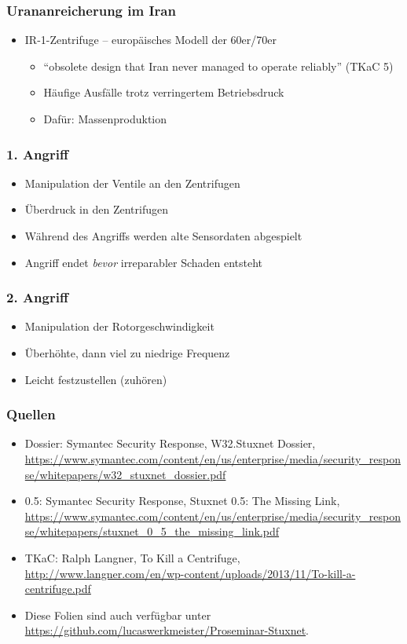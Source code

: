 \documentclass{beamer}
\begin{document}
\begin{frame}
  \frametitle{Urananreicherung im Iran}
  \begin{itemize}
    \item IR-1-Zentrifuge – europäisches Modell der 60er/70er
      \begin{itemize}
        \item ``obsolete design that Iran never managed to operate reliably'' (TKaC 5)
        \item Häufige Ausfälle trotz verringertem Betriebsdruck
        \item Dafür: Massenproduktion
      \end{itemize}
  \end{itemize}
\end{frame}

\begin{frame}
  \frametitle{1. Angriff}
  \begin{itemize}
    \item Manipulation der Ventile an den Zentrifugen
    \item Überdruck in den Zentrifugen
    \item Während des Angriffs werden alte Sensordaten abgespielt
    \item Angriff endet \emph{bevor} irreparabler Schaden entsteht
  \end{itemize}
\end{frame}

\begin{frame}
  \frametitle{2. Angriff}
  \begin{itemize}
    \item Manipulation der Rotorgeschwindigkeit
    \item Überhöhte, dann viel zu niedrige Frequenz
    \item Leicht festzustellen (zuhören)
  \end{itemize}
\end{frame}



\begin{frame}
  \frametitle{Quellen}
  \fontsize{6pt}{7.2}\selectfont
  \begin{itemize}
    \item Dossier: Symantec Security Response, W32.Stuxnet Dossier, \url{https://www.symantec.com/content/en/us/enterprise/media/security_response/whitepapers/w32_stuxnet_dossier.pdf}
    \item 0.5: Symantec Security Response, Stuxnet 0.5: The Missing Link, \url{https://www.symantec.com/content/en/us/enterprise/media/security_response/whitepapers/stuxnet_0_5_the_missing_link.pdf}
    \item TKaC: Ralph Langner, To Kill a Centrifuge, \url{http://www.langner.com/en/wp-content/uploads/2013/11/To-kill-a-centrifuge.pdf}
    \item Diese Folien sind auch verfügbar unter \url{https://github.com/lucaswerkmeister/Proseminar-Stuxnet}.
  \end{itemize}
\end{frame}

\immediate\closeout\notesfile
\end{document}
